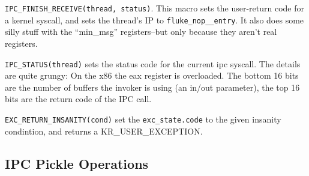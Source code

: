 {\tt IPC_FINISH_RECEIVE(thread, status)}.  This macro sets the
user-return code for a kernel syscall, and sets the thread's
IP to {\tt fluke_nop__entry}.  It also does some silly stuff
with the ``min_msg'' registers--but only because they aren't
real registers.

{\tt IPC_STATUS(thread)} sets the status code for the current ipc
syscall.  The details are quite grungy:  On the x86 the eax register
is overloaded.  The bottom 16 bits are the number of buffers
the invoker is using (an in/out parameter), the top 16 bits are
the return code of the IPC call.

{\tt EXC_RETURN_INSANITY(cond)} set the {\tt exc_state.code} to
the given insanity condintion, and returns a KR_USER_EXCEPTION.

\subsection{IPC Pickle Operations}

